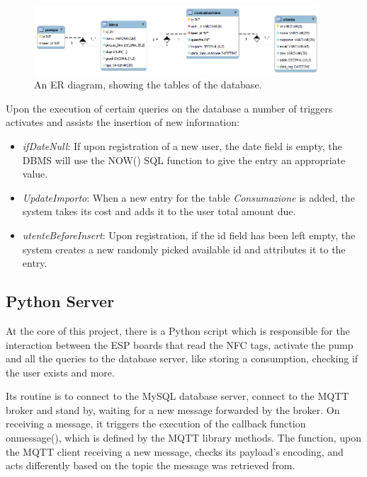 \documentclass[target=bach,aauheader=,style=]{thud}
\begin{document}
\begin{figure}[h!]
	\centering
	\includegraphics[width=0.95\textwidth]{ER}
	\caption{An ER diagram, showing the tables of the database.}
	\label{fig:dbtables}
\end{figure} 

Upon the execution of certain queries on the database a number of triggers activates and assists the insertion of new information:
\begin{itemize}
	\item \emph{ifDateNull}: If upon registration of a new user, the date field is empty, the DBMS will use the NOW() SQL function to give the entry an appropriate value.
	\item \emph{UpdateImporto}: When a new entry for the table \emph{Consumazione} is added, the system takes its cost and adds it to the user total amount due.
	\item \emph{utenteBeforeInsert}: Upon registration, if the id field has been left empty, the system creates a new randomly picked available id and attributes it to the entry.
\end{itemize}


\subsection{Python Server}
At the core of this project, there is a Python script which is responsible for the interaction between the ESP boards that read the NFC tags, activate the pump and all the queries to the database server, like storing a consumption, checking if the user exists and more.

Its routine is to connect to the MySQL database server, connect to the MQTT broker and stand by, waiting for a new message forwarded by the broker. On receiving a message, it triggers the execution of the callback function onmessage(), which is defined by the MQTT library methods. \newpage
The function, upon the MQTT client receiving a new message, checks its payload's encoding, and acts differently based on the topic the message was retrieved from.
\end{document}
